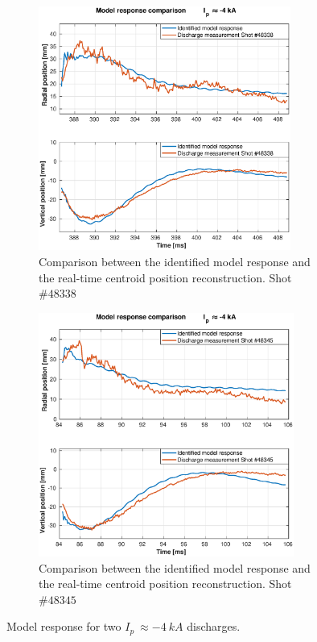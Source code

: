 \begin{figure}
	\begin{subfigure}[b]{0.5\textwidth}
		\includegraphics[height=8.0cm]{Chp5/SimResp_338.eps}  
		\caption{Comparison between the  identified model response and the real-time centroid position reconstruction. Shot $\#48338 $ \label{SimResp338} }
	\end{subfigure}
\hspace{0.45cm} %
	\begin{subfigure}[b]{0.5\textwidth}
		\includegraphics[height=8.0cm]{Chp5/SimResp_345.eps}        
		\caption{ Comparison between the  identified model response and the real-time centroid position reconstruction. Shot $\#48345 $ \label{SimResp345}}
	\end{subfigure}
	\caption{ Model response for two $I_p~\approx -4~kA$ discharges. \label{SimResp_neg}}
\end{figure}


